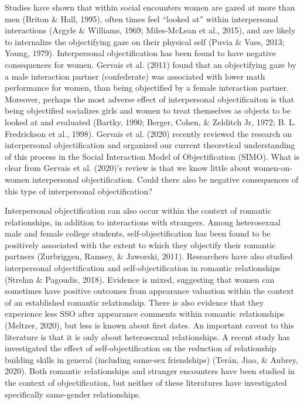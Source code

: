 \documentclass[man]{apa6}
\begin{document}
Studies have shown that within social encounters women are gazed at more
than men (Briton \& Hall, 1995), often times feel \enquote{looked at}
within interpersonal interactions (Argyle \& Williams, 1969;
Miles-McLean et al., 2015), and are likely to internalize the
objectifying gaze on their physical self (Puvia \& Vaes, 2013; Young,
1979). Interpersonal objectification has been found to have negative
consequences for women. Gervais et al. (2011) found that an objectifying
gaze by a male interaction partner (confederate) was associated with
lower math performance for women, than being objectified by a female
interaction partner. Moreover, perhaps the most adverse effect of
interpersonal objectificaiton is that being objectified socializes girls
and women to treat themselves as objects to be looked at and evaluated
(Bartky, 1990; Berger, Cohen, \& Zelditch Jr, 1972; B. L. Fredrickson et
al., 1998). Gervais et al. (2020) recently reviewed the research on
interpersonal objectification and organized our current theoretical
understanding of this process in the Social Interaction Model of
Objectification (SIMO). What is clear from Gervais et al. (2020)'s
review is that we know little about women-on-women interpersonal
objectification. Could there also be negative consequences of this type
of interpersonal objectification?

Interpersonal objectification can also occur within the context of
romantic relationships, in addition to interactions with strangers.
Among heterosexual male and female college students,
self-objectification has been found to be positively associated with the
extent to which they objectify their romantic partners (Zurbriggen,
Ramsey, \& Jaworski, 2011). Researchers have also studied interpersonal
objectification and self-objectification in romantic relationships
(Strelan \& Pagoudis, 2018). Evidence is mixed, suggesting that women
can sometimes have positive outcomes from appearance valuation within
the context of an established romantic relationship. There is also
evidence that they experience less SSO after appearance comments within
romantic relationships (Meltzer, 2020), but less is known about first
dates. An important caveat to this literature is that it is only about
heterosexual relationships. A recent study has investigated the effect
of self-objectification on the reduction of relationship building skills
in general (including same-sex friendships) (Terán, Jiao, \& Aubrey,
2020). Both romantic relationships and stranger encounters have been
studied in the context of objectification, but neither of these
literatures have investigated specifically same-gender relationships.
\end{document}
